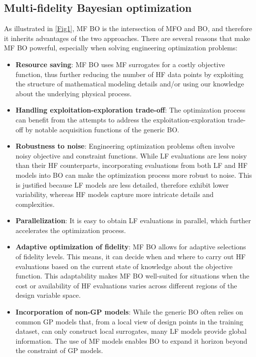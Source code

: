 \documentclass[iicol,sn-basic]{sn-jnl}%
\begin{document}
\subsection{Multi-fidelity Bayesian optimization}\label{Sec33}

As illustrated in \cref{Fig1}, MF BO is the intersection of MFO and BO, and therefore it inherits advantages of the two approaches.
There are several reasons that make MF BO powerful, especially when solving engineering optimization problems:
\begin{itemize}
	\item \textbf{Resource saving}: MF BO uses MF surrogates for a costly objective function, thus further reducing the number of HF data points by exploiting the structure of mathematical modeling details and/or using our knowledge about the underlying physical process.
	
	\item \textbf{Handling exploitation-exploration trade-off}: The optimization process can benefit from the attempts to address the exploitation-exploration trade-off by notable acquisition functions of the generic BO.
	
	\item \textbf{Robustness to noise}: Engineering optimization problems often involve noisy objective and constraint functions.
	While LF evaluations are less noisy than their HF counterparts, incorporating evaluations from both LF and HF models into BO can make the optimization process more robust to noise.
	This is justified because LF models are less detailed, therefore exhibit lower variability, whereas HF models capture more intricate details and complexities.
	
	\item \textbf{Parallelization}: It is easy to obtain LF evaluations in parallel, which further accelerates the optimization process.
	
	\item \textbf{Adaptive optimization of fidelity}: MF BO allows for adaptive selections of fidelity levels.
	This means, it can decide when and where to carry out HF evaluations based on the current state of knowledge about the objective function.
	This adaptability makes MF BO well-suited for situations when the cost or availability of HF evaluations varies across different regions of the design variable space.
	
	\item \textbf{Incorporation of non-GP models}: While the generic BO often relies on common GP models that, from a local view of design points in the training dataset, can only construct local surrogates, many LF models provide global information.
	The use of MF models enables BO to expand it horizon beyond the constraint of GP models.
	
\end{itemize}
\end{document}
